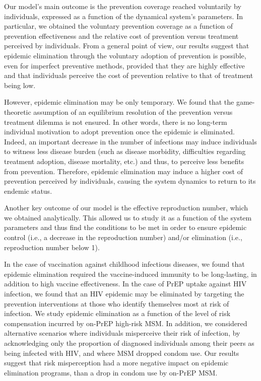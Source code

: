 Our model's main outcome is the prevention coverage reached voluntarily by individuals, expressed as a function of the dynamical system's parameters. In particular, we obtained the voluntary prevention coverage as a function of prevention effectiveness and the relative cost of prevention versus treatment perceived by individuals. From a general point of view, our results suggest that epidemic elimination through the voluntary adoption of prevention is possible, even for imperfect preventive methods, provided that they are highly effective and that individuals perceive the cost of prevention relative to that of treatment being low. 

However, epidemic elimination may be only temporary. We found that the game-theoretic assumption of an equilibrium resolution of the prevention versus treatment dilemma is not ensured. In other words, there is no long-term individual motivation to adopt prevention once the epidemic is eliminated. Indeed, an important decrease in the number of infections may induce individuals to witness less disease burden (such as disease morbidity, difficulties regarding treatment adoption, disease mortality, etc.) and thus, to perceive less benefits from prevention. Therefore, epidemic elimination may induce a higher cost of prevention perceived by individuals, causing the system dynamics to return to its endemic status.

Another key outcome of our model is the effective reproduction number, which we obtained analytically. This allowed us to study it as a function of the system parameters and thus find the conditions to be met in order to ensure epidemic control (i.e., a decrease in the reproduction number) and/or elimination (i.e., reproduction number below 1). 

In the case of vaccination against childhood infectious diseases, we found that epidemic elimination required the vaccine-induced immunity to be long-lasting, in addition to high vaccine effectiveness. In the case of PrEP uptake against HIV infection, we found that an HIV epidemic may be eliminated by targeting the prevention interventions at those who identify themselves most at risk of infection. We study epidemic elimination as a function of the level of risk compensation incurred by on-PrEP high-risk MSM. In addition, we considered  alternative scenarios where individuals misperceive their risk of infection, by acknowledging only the proportion of diagnosed individuals among their peers as being infected with HIV, and where MSM dropped condom use. Our results suggest that risk misperception had a more negative impact on epidemic elimination programs, than a drop in condom use by on-PrEP MSM.


